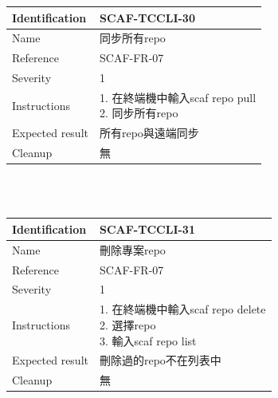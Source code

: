 \documentclass{report}
\begin{document}
\begin{tabularx}{\textwidth}{
  |p{}%
  |p{}|%
  }
  \hline
  \centering Identification &  SCAF-TCCLI-30 \\
  \hline
  \centering Name & 同步所有repo \\
  \hline
  \centering Reference & SCAF-FR-07 \\
  \hline
  \centering Severity & 1 \\
  \hline
  \centering Instructions & 
  \makecell[l]{
    1. 在終端機中輸入scaf repo pull \\
    2. 同步所有repo \\
  }\\
  \hline
  \centering Expected result & 所有repo與遠端同步 \\
  \hline
  \centering Cleanup & 無 \\
  \hline
\end{tabularx}
\\
\newline
\\

\begin{tabularx}{\textwidth}{
  |p{}%
  |p{}|%
  }
  \hline
  \centering Identification &  SCAF-TCCLI-31 \\
  \hline
  \centering Name & 刪除專案repo \\
  \hline
  \centering Reference & SCAF-FR-07 \\
  \hline
  \centering Severity & 1 \\
  \hline
  \centering Instructions & 
  \makecell[l]{
    1. 在終端機中輸入scaf repo delete \\
    2. 選擇repo \\
    3. 輸入scaf repo list \\
  }\\
  \hline
  \centering Expected result & 刪除過的repo不在列表中 \\
  \hline
  \centering Cleanup & 無 \\
  \hline
\end{tabularx}
\\
\newline
\\
\end{document}
